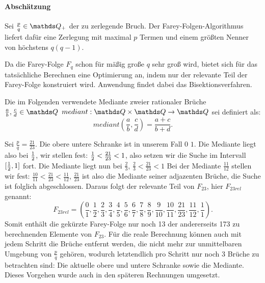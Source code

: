 \paragraph{Abschätzung}Sei $\frac{p}{q} \in \Q_+$ der zu zerlegende Bruch. Der Farey-Folgen-Algorithmus liefert dafür eine Zerlegung mit maximal $p$ Termen und einem größten Nenner von höchstens $q(q-1)$. \cite[S.343]{Bleicher1972}

Da die Farey-Folge $F_q$ schon für mäßig große $q$ sehr groß wird, bietet sich für das tatsächliche Berechnen eine Optimierung an, indem nur der relevante Teil der Farey-Folge konstruiert wird. Anwendung findet dabei das Bisektionsverfahren.
\begin{def1}\label{def:mediant}
	Die im Folgenden verwendete Mediante zweier rationaler Brüche $\frac{a}{b}, \frac{c}{d} \in \Q$ $mediant: \Q \times \Q \rightarrow \Q$ sei definiert als:
	$$mediant \left(\frac{a}{b}, \frac{c}{d}\right) = \frac{a+c}{b+d}.$$
\end{def1}
\begin{bsp}\label{bsp:Frel}
	Sei $\frac{p}{q} = \frac{21}{23}$. Die obere \bzw untere Schranke ist in unserem Fall $0$ \bzw $1$. Die Mediante liegt also bei $\frac{1}{2}$, wir stellen fest: $\frac{1}{2}<\frac{21}{23}<1$, also setzen wir die Suche im Intervall $[\frac{1}{2}, 1]$ fort. Die Mediante liegt nun bei $\frac{2}{3}$, $\frac{2}{3}<\frac{21}{23}<1$ \usw
	Bei der Mediante $\frac{11}{12}$ stellen wir fest: $\frac{10}{11} < \frac{21}{23} < \frac{11}{12}$, $\frac{21}{23}$ ist also die Mediante seiner adjazenten Brüche, die Suche ist folglich abgeschlossen. Daraus folgt der relevante Teil von $F_{23}$, hier $F_{23rel}$ genannt: $$F_{23rel} = \left(\frac{0}{1}, \frac{1}{2}, \frac{2}{3}, \frac{3}{4}, \frac{4}{5}, \frac{5}{6}, \frac{6}{7}, \frac{7}{8}, \frac{8}{9}, \frac{9}{10}, \frac{10}{11}, \frac{21}{23}, \frac{11}{12}, \frac{1}{1}\right).$$
	Somit enthält die gekürzte Farey-Folge nur noch 13 der andererseits 173 zu berechnenden Elemente von $F_{23}$. Für die reale Berechnung können auch mit jedem Schritt die Brüche entfernt werden, die nicht mehr zur unmittelbaren Umgebung von $\frac{p}{q}$ gehören, wodurch letztendlich pro Schritt nur noch 3 Brüche zu betrachten sind: Die aktuelle obere und untere Schranke sowie die Mediante. Dieses Vorgehen wurde auch in den späteren Rechnungen umgesetzt.
\end{bsp}